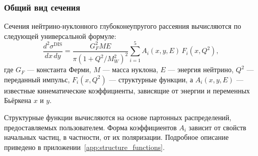 
\subsubsection{Общий вид сечения}
Сечения нейтрино-нуклонного глубоконеупругого рассеяния вычисляются по следующей универсальной формуле:
\begin{equation}
    \frac{d^2 \sigma^{\text{DIS}}}{dx\,dy} = \frac{G_F^2 M E}{\pi(1 + Q^2/M_W^2)^2} \sum\limits_{i=1}^{5} A_i(x, y, E)\,F_i(x, Q^2),
    \label{eq:xsec_general}
\end{equation}
где $G_F$ — константа Ферми, $M$ — масса нуклона, $E$ — энергия нейтрино, $Q^2$ — переданный импульс, $F_i(x, Q^2)$ — структурные функции, а $A_i(x, y, E)$ — известные кинематические коэффициенты, зависящие от энергии и переменных Бьёркена $x$ и $y$. 

Структурные функции вычисляются на основе партонных распределений, предоставляемых пользователем. Форма коэффициентов $A_i$ зависит от свойств начальных частиц, в частности, от их поляризации. Подробное описание приведено в приложении~\ref{app:structure_functions}.

